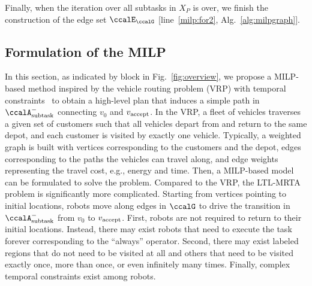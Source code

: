 \documentclass[Afour,sageh,times]{sagej}
\newcommand*\circled[1]{\tikz[baseline=(char.base)]{
            \node[shape=circle,draw,inner sep=1pt] (char) {#1};}}
\newcommand{\auto}[1]{\ccalA_{\textup{#1}}}
\newcommand{\vertex}[1]{v_{\textup{#1}}}
\newcommand{\node}[1]{V_{n}^{\text{#1}}}
\newcounter{phase} \setcounter{phase}{0}
\newcounter{subphase}[phase] \setcounter{subphase}{0}
\begin{document}
\label{edge:vertex3}



Finally,  when the iteration over all subtasks in $X_{P}$ is over, we finish the construction of  the edge set $\ccalE_\ccalG$ [line~\ref{milp:for2},  Alg.~\ref{alg:milpgraph}].

\subsection{Formulation of the MILP}\label{sec:milp}
In this section, as indicated by block \circled{4} in Fig.~\ref{fig:overview}, we propose a MILP-based method inspired by the vehicle routing problem (VRP) with temporal constraints~\citep{bredstrom2008combined} to obtain a high-level plan that induces a simple path in $\auto{subtask}^-$ connecting $v_0$ and $\vertex{accept}$. In the VRP, a fleet of vehicles traverses a given set of customers such that all vehicles depart from and return to the same depot, and each customer is visited by exactly one vehicle. Typically, a weighted graph is built with vertices corresponding to the customers and the depot, edges corresponding to the paths the vehicles can travel along, and edge weights representing the travel cost, e.g., energy and time. Then, a MILP-based model can be formulated to solve the problem. Compared to the VRP, the LTL-MRTA problem is significantly more complicated. Starting from vertices pointing to initial locations,  robots move along edges in $\ccalG$ to drive the transition in~$\auto{subtask}^-$ from $v_0$ to $\vertex{\text{accept}}$. First, robots are not required to return to their initial locations. Instead, there may exist robots that need to execute the task forever corresponding to the  ``always'' operator. Second, there may exist labeled regions that do not need to be visited at all and others that need to be visited exactly once,  more than once, or even infinitely many times. Finally, complex temporal constraints exist among robots.
\end{document}
